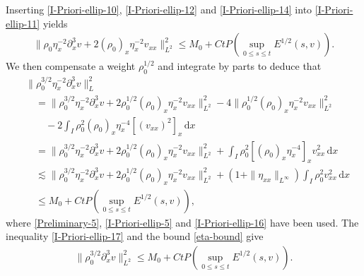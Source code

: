 \documentclass[11pt, reqno]{amsart}
\newcommand{\diff}{\mathrm{d}}
\numberwithin{equation}{section}
\begin{document}
Inserting \eqref{I-Priori-ellip-10}, \eqref{I-Priori-ellip-12} and \eqref{I-Priori-ellip-14} into \eqref{I-Priori-ellip-11} yields
\begin{equation}\label{I-Priori-ellip-16}
\begin{aligned}
\|\rho_0\eta_x^{-2}\partial_x^3v+2(\rho_0)_x\eta_x^{-2}v_{xx}\|_{L^2}^2\leq M_0+Ct P(\sup_{0\leq s\leq t}E^{1/2}(s,v)).
\end{aligned}
\end{equation}
We then compensate a weight \(\rho_0^{1/2}\) and integrate by parts to deduce that
\begin{equation}\label{I-Priori-ellip-17}
\begin{aligned}
&\|\rho_0^{3/2}\eta_x^{-2}\partial_x^3v\|_L^2\\
&\quad= \|\rho_0^{3/2}\eta_x^{-2}\partial_x^3v+2\rho_0^{1/2}(\rho_0)_x\eta_x^{-2}v_{xx}\|_{L^2}^2
-4\|\rho_0^{1/2}(\rho_0)_x\eta_x^{-2}v_{xx}\|_{L^2}^2\\
&\qquad-2\int_I\rho_0^2(\rho_0)_x\eta_x^{-4}[(v_{xx})^2]_x\,\diff x\\
&\quad= \|\rho_0^{3/2}\eta_x^{-2}\partial_x^3v+2\rho_0^{1/2}(\rho_0)_x\eta_x^{-2}v_{xx}\|_{L^2}^2
+\int_I\rho_0^2[(\rho_0)_x\eta_x^{-4}]_{x}v_{xx}^2\,\diff x\\
&\quad\lesssim  \|\rho_0^{3/2}\eta_x^{-2}\partial_x^3v+2\rho_0^{1/2}(\rho_0)_x\eta_x^{-2}v_{xx}\|_{L^2}^2
+(1+\|\eta_{xx}\|_{L^\infty})\int_I\rho_0^2v_{xx}^2\,\diff x\\
&\quad\leq M_0+Ct P(\sup_{0\leq s\leq t}E^{1/2}(s,v)),
\end{aligned}
\end{equation}
where \eqref{Preliminary-5}, \eqref{I-Priori-ellip-5} and \eqref{I-Priori-ellip-16} have been used.
The inequality \eqref{I-Priori-ellip-17} and the bound \eqref{eta-bound} give
\begin{equation}\label{I-Priori-ellip-third}
\begin{aligned}
\|\rho_0^{3/2}\partial_x^3v\|_{L^2}^2\leq M_0+Ct P(\sup_{0\leq s\leq t}E^{1/2}(s,v)).
\end{aligned}
\end{equation}
\end{document}

